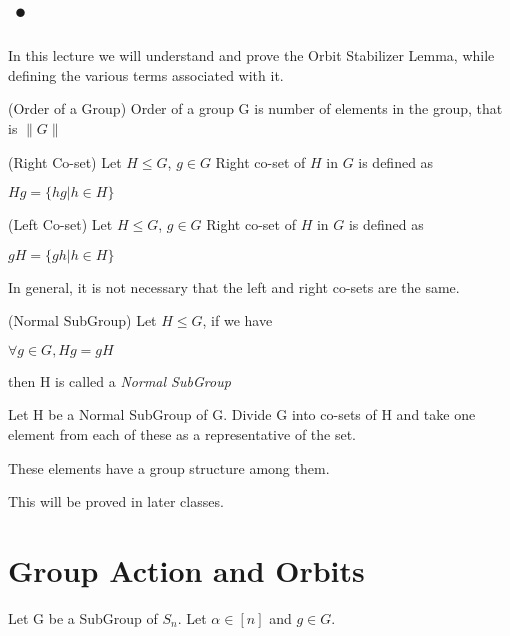 

\section{•}
In this lecture we will understand and prove the Orbit Stabilizer Lemma, while defining the various terms associated with it.


\begin{definition}(Order of a Group) Order of a group G is number of elements in the group, that is $\|G\|$ \end{definition}

\begin{definition}(Right Co-set) Let $H \le G$, $g \in G$ Right co-set of $H$ in $G$ is defined as 
\begin{center}
$Hg = \{hg | h \in H\}$
\end{center}
 \end{definition}

\begin{definition}(Left Co-set) Let $H \le G$, $g \in G$ Right co-set of $H$ in $G$ is defined as 
\begin{center}
$gH = \{gh | h \in H\}$
\end{center}
\end{definition}

\begin{note}
In general, it is not necessary that the left and right co-sets are the same.
\end{note}

\begin{definition}(Normal SubGroup)
Let $H \le G$, if we have 
\begin{center}
$\forall g \in G, Hg= gH$
\end{center}
then H is called a \em Normal SubGroup
\end{definition}

Let H be a Normal SubGroup of G. Divide G into co-sets of H and take one element from each of these as a representative of the set.
\begin{claim} These elements have a group structure among them. \end{claim}
This will be proved in later classes.

\section{Group Action and Orbits}
Let G be a SubGroup of $S_n$. Let $\alpha \in [n]$ and $g \in G$.

